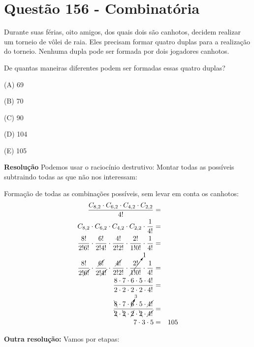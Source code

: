 \section{Questão 156 - Combinatória}

Durante suas férias, oito amigos, dos quais dois são canhotos, decidem realizar um torneio de vôlei de raia.
Eles precisam formar quatro duplas para a realização do torneio. Nenhuma dupla pode ser formada por dois jogadores canhotos.

De quantas maneiras diferentes podem ser formadas essas quatro duplas?

\noindent (A)  69

\noindent (B)  70

\noindent (C)  90

\noindent (D)  104

\noindent (E) 105

\textbf{Resolução}
Podemos usar o raciocínio destrutivo: Montar todas as possíveis subtraindo todas as que não nos interessam:

\renewcommand{\CancelColor}{\color{red}}

Formação de todas as combinações possíveis, sem levar em conta os canhotos: 
\begin{eqnarray*}
\dfrac{C_{8, 2} \cdot C_{6, 2} \cdot C_{4, 2} \cdot C_{2, 2}  }{4!} &=& \\
C_{8, 2} \cdot C_{6, 2} \cdot C_{4, 2} \cdot C_{2, 2}  \cdot \dfrac{1}{4!} &=& \\
\dfrac{8!}{2! 6!} \cdot \dfrac{6!}{2! 4!} \cdot \dfrac{4!}{2! 2!} \cdot \dfrac{2!}{1! 0!} \cdot \dfrac{1}{4!}  &=& \\
\dfrac{8!}{2! \cancel{6!}} \cdot \dfrac{\cancel{6!}}{2! \cancel{4!}} \cdot \dfrac{\cancel{4!}}{2! 2!} \cdot \cancelto{1}{\dfrac{2!}{1! 0!}} \cdot \dfrac{1}{4!}  &=& \\
\dfrac{8 \cdot 7 \cdot 6 \cdot 5 \cdot 4!}{2 \cdot 2 \cdot 2 \cdot 2 \cdot 4!}  &=& \\
\dfrac{\bcancel{8} \cdot 7 \cdot \cancelto{3}{6} \cdot 5 \cdot \cancel{4!}}{\bcancel{2} \cdot \bcancel{2} \cdot \cancel{2} \cdot \bcancel{2} \cdot \cancel{4!}}  &=& \\
7 \cdot 3 \cdot 5  &=& 105\\
\end{eqnarray*}

\textbf{Outra resolução:}
Vamos por etapas:

